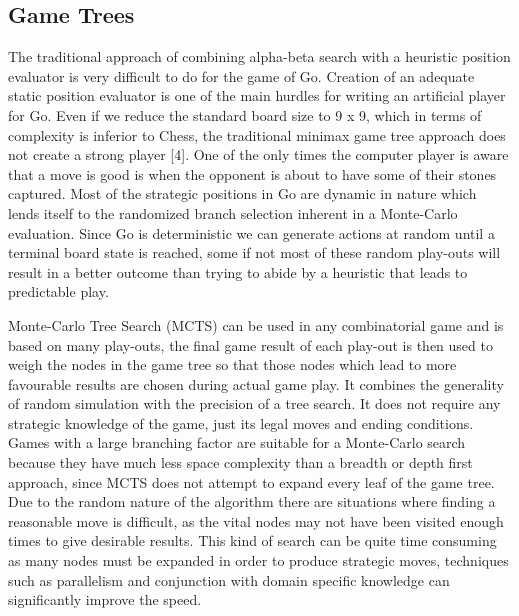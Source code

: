 \documentclass[conference]{IEEEtran}
\begin{document}
\subsection{Game Trees}
The traditional approach of combining alpha-beta search with a heuristic position evaluator is very difficult to do for the game of Go. Creation of an adequate static position evaluator is one of the main hurdles for writing an artificial player for Go. Even if we reduce the standard board size to 9 x 9, which in terms of complexity is inferior to Chess, the traditional minimax game tree approach does not create a strong player [4]. One of the only times the computer player is aware that a move is good is when the opponent is about to have some of their stones captured. Most of the strategic positions in Go are dynamic in nature which lends itself to the randomized branch selection inherent in a Monte-Carlo evaluation. Since Go is deterministic we can generate actions at random until a terminal board state is reached, some if not most of these random play-outs will result in a better outcome than trying to abide by a heuristic that leads to predictable play.\par
Monte-Carlo Tree Search (MCTS) can be used in any combinatorial game and is based on many play-outs, the final game result of each play-out is then used to weigh the nodes in the game tree so that those nodes which lead to more favourable results are chosen during actual game play. It combines the generality of random simulation with the precision of a tree search. It does not require any strategic knowledge of the game, just its legal moves and ending conditions. Games with a large branching factor are suitable for a Monte-Carlo search because they have much less space complexity than a breadth or depth first approach, since MCTS does not attempt to expand every leaf of the game tree. Due to the random nature of the algorithm there are situations where finding a reasonable move is difficult, as the vital nodes may not have been visited enough times to give desirable results. This kind of search can be quite time consuming as many nodes must be expanded in order to produce strategic moves, techniques such as parallelism and conjunction with domain specific knowledge can significantly improve the speed.
\end{document}
